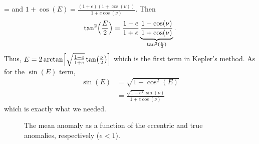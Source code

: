  =
\) and
\(1 + \cos(E) = \frac{(1 + e)(1 + \cos(\nu))}{1 + e\cos(\nu)}\).
Then
\[
\tan^2\Bigl(\frac{E}{2}\Bigr) =
\frac{1 - e}{1 + e}\underbrace{\frac{1 - \cos(\nu)}{1 +
    \cos(\nu)}}_{\tan^2(\frac{\nu}{2})}.
\]
Thus,
\(E = 2\arctan\Bigl[\sqrt{\frac{1 - e}{1 + e}}
\tan\bigl(\frac{\nu}{2}\bigr)\Bigr]\) which is the first term in Kepler's
method.
As for the \(\sin(E)\) term,
\begin{align*}
  \sin(E) & = \sqrt{1 - \cos^2(E)}\\
          & = \frac{\sqrt{1 - e^2}\sin(\nu)}{1 + e\cos(\nu)}
\end{align*}
which is exactly what we needed.
\begin{figure}
  \centering
  \qquad
  \caption[Mean Anomaly Function Ellipse]
  {The mean anomaly as a function of the eccentric and true anomalies,
    respectively (\(e < 1\)).}
  \label{meananomalyfunctionofeccentric}
\end{figure}
